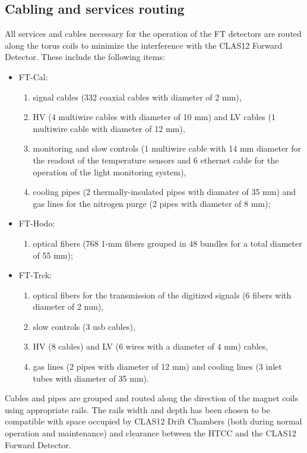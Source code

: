 \subsection{Cabling and services routing}
All services and cables necessary for the operation of the FT detectors are routed along the torus coils to minimize the interference with the CLAS12 Forward Detector. These include the following items:
\begin{itemize}
\item{FT-Cal:}
\begin{enumerate}
\item{signal cables (332 coaxial cables with diameter of 2 mm),}
\item{HV (4 multiwire cables with diameter of 10 mm) and LV cables (1 multiwire cable with diameter of 12 mm),}
\item{monitoring and slow controls (1 multiwire cable with 14 mm diameter for the readout of the temperature sensors and 6 ethernet cable for the operation of the light monitoring system),}
\item{cooling pipes (2 thermally-insulated pipes with diamater of 35 mm) and gas lines for the nitrogen purge (2 pipes with diameter of 8 mm);}
\end{enumerate}
\item{FT-Hodo:}
\begin{enumerate}
\item{optical fibers (768 1-mm fibers grouped in 48 bundles for a total diameter of 55 mm);}
\end{enumerate}
\item{FT-Trck:}
\begin{enumerate}
\item{optical fibers for the transmission of the digitized signals (6 fibers with diameter of 2 mm),}
\item{slow controls (3 usb cables),}
\item{HV (8 cables) and LV (6 wires with a diameter of 4 mm) cables,}
\item{gas lines (2 pipes with diameter of 12 mm) and cooling lines (3 inlet tubes with diameter of 35 mm).}
\end{enumerate}
\end{itemize}


Cables and pipes are grouped and routed along the direction of the magnet coils using appropriate rails. The rails width and depth has been chosen
to be compatible with  space occupied by  CLAS12 Drift Chambers (both during normal operation  and maintenance) and clearance between the HTCC and the CLAS12 Forward Detector. 

